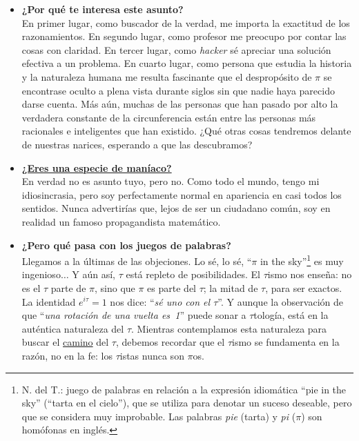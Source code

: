 \begin{itemize}
  \item \textbf{¿Por qué te interesa este asunto?} \\ En primer lugar, como buscador de la verdad, me importa la exactitud de los razonamientos. En segundo lugar, como profesor me preocupo por contar las cosas con claridad. En tercer lugar, como \emph{hacker} sé apreciar una solución efectiva a un problema. En cuarto lugar, como persona que estudia la historia y la naturaleza humana me resulta fascinante que el despropósito de $\pi$ se encontrase oculto a plena vista durante siglos sin que nadie haya parecido darse cuenta. Más aún, muchas de las personas que han pasado por alto la verdadera constante de la circunferencia están entre las personas más racionales e inteligentes que han existido. ¿Qué otras cosas tendremos delante de nuestras narices, esperando a que las descubramos?

  \item \href{https://youtube.com/clip/UgkxgkaP4J9lCZ8Yjd7Fe9iLGDHYfd9anfR1}{\textbf{¿Eres una especie de maníaco?}} \\ En verdad no es asunto tuyo, pero no. Como todo el mundo, tengo mi idiosincrasia, pero soy perfectamente normal en apariencia en casi todos los sentidos. Nunca advertirías que, lejos de ser un ciudadano común, soy en realidad un famoso propagandista matemático.


  \item \textbf{¿Pero qué pasa con los juegos de palabras?} \\ Llegamos a la últimas de las objeciones. Lo sé, lo sé, ``$\pi$ in the sky''\footnote{N. del T.: juego de palabras en relación a la expresión idiomática ``pie in the sky'' (``tarta en el cielo''), que se utiliza para denotar un suceso deseable, pero que se considera muy improbable. Las palabras \emph{pie} (tarta) y \emph{pi} ($\pi$) son homófonas en inglés.} es muy ingenioso$\ldots$ Y aún así, $\tau$ está repleto de posibilidades. El $\tau$ismo nos enseña: no es el $\tau$ parte de $\pi$, sino que $\pi$ es parte del $\tau$; la mitad de $\tau$, para ser exactos. La identidad $e^{i\tau} = 1$ nos dice: ``\emph{sé uno con el $\tau$}''. Y aunque la observación de que ``\emph{una rotación de una vuelta es~1}'' puede sonar a $\tau$tología, está en la auténtica naturaleza del $\tau$. Mientras contemplamos esta naturaleza para buscar el \href{https://es.wikipedia.org/wiki/Tao}{camino} del $\tau$, debemos recordar que el $\tau$ismo se fundamenta en la razón, no en la fe: los $\tau$istas nunca son $\pi$os.


\end{itemize}


